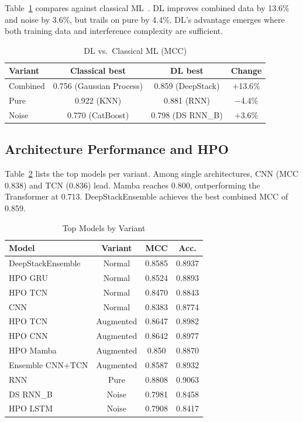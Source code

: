 Table~\ref{tab:ml_comparison} compares against classical ML~\cite{ribeiro2026eucnc}. DL improves combined data by 13.6\% and noise by 3.6\%, but trails on pure by 4.4\%. DL's advantage emerges where both training data and interference complexity are sufficient.

\begin{table}
    \centering
    \caption{DL vs.\ Classical ML (MCC)}
    \label{tab:ml_comparison}
    \begin{tabular}{lccc}\toprule
        Variant  & Classical best           & DL best           & Change    \\\midrule
        Combined & 0.756 (Gaussian Process) & 0.859 (DeepStack) & $+$13.6\% \\
        Pure     & 0.922 (KNN)              & 0.881 (RNN)       & $-$4.4\%  \\
        Noise    & 0.770 (CatBoost)         & 0.798 (DS RNN\_B) & $+$3.6\%  \\\bottomrule
    \end{tabular}
\end{table}

\subsection{Architecture Performance and HPO}

Table~\ref{tab:combined_results} lists the top models per variant. Among single architectures, CNN (MCC 0.838) and TCN (0.836) lead. Mamba reaches 0.800, outperforming the Transformer at 0.713. DeepStackEnsemble achieves the best combined MCC of 0.859.

\begin{table}
    \centering
    \caption{Top Models by Variant}
    \label{tab:combined_results}
    \begin{tabular}{lccc}\toprule
        Model             & Variant   & MCC    & Acc.   \\\midrule
        DeepStackEnsemble & Normal    & 0.8585 & 0.8937 \\
        HPO GRU           & Normal    & 0.8524 & 0.8893 \\
        HPO TCN           & Normal    & 0.8470 & 0.8843 \\
        CNN               & Normal    & 0.8383 & 0.8774 \\\midrule
        HPO TCN           & Augmented & 0.8647 & 0.8982 \\
        HPO CNN           & Augmented & 0.8642 & 0.8977 \\
        HPO Mamba         & Augmented & 0.850  & 0.8870 \\
        Ensemble CNN+TCN  & Augmented & 0.8587 & 0.8932 \\\midrule
        RNN               & Pure      & 0.8808 & 0.9063 \\\midrule
        DS RNN\_B         & Noise     & 0.7981 & 0.8458 \\
        HPO LSTM          & Noise     & 0.7908 & 0.8417 \\\bottomrule
    \end{tabular}
\end{table}

